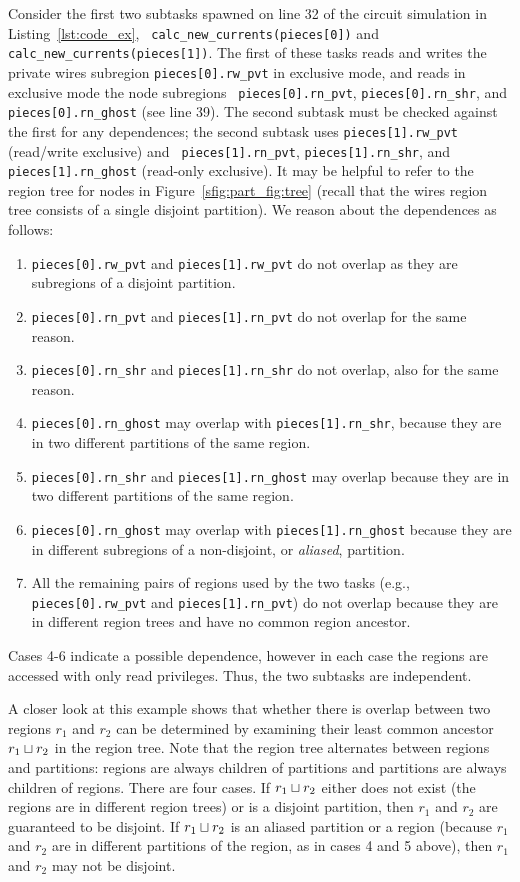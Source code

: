 Consider the first two subtasks spawned on line 32 of the circuit
simulation in Listing~\ref{lst:code_ex}, {\tt
calc\_new\_currents(pieces[0])} and {\tt
calc\_new\_currents(pieces[1])}.  The first of these tasks reads and
writes the private wires subregion {\tt pieces[0].rw\_pvt} in
exclusive mode, and reads in exclusive mode the node subregions {\tt
pieces[0].rn\_pvt}, {\tt pieces[0].rn\_shr}, and {\tt
pieces[0].rn\_ghost} (see line 39).  The second subtask must be
checked against the first for any dependences; the second subtask uses
{\tt pieces[1].rw\_pvt} (read/write exclusive) and {\tt
pieces[1].rn\_pvt}, {\tt pieces[1].rn\_shr}, and {\tt pieces[1].rn\_ghost} (read-only exclusive).
It may be helpful to refer to the region tree for nodes in Figure~\ref{sfig:part_fig:tree} (recall that the wires region tree consists of a single disjoint partition).  We reason about the dependences as follows:
\begin{enumerate}
\item {\tt pieces[0].rw\_pvt} and {\tt pieces[1].rw\_pvt} do not overlap as they are subregions of a disjoint partition.
\item {\tt pieces[0].rn\_pvt} and {\tt pieces[1].rn\_pvt} do not overlap for the same reason.
\item {\tt pieces[0].rn\_shr} and {\tt pieces[1].rn\_shr} do not overlap, also for the same reason.
\item {\tt pieces[0].rn\_ghost} may overlap with {\tt pieces[1].rn\_shr}, because they are in two different
  partitions of the same region.
\item {\tt pieces[0].rn\_shr} and {\tt pieces[1].rn\_ghost} may overlap because they are in two different
  partitions of the same region.
\item {\tt pieces[0].rn\_ghost} may overlap with {\tt pieces[1].rn\_ghost} because they are in different subregions of
a non-disjoint, or {\em aliased}, partition.
\item All the remaining pairs of regions used by the two tasks (e.g., {\tt pieces[0].rw\_pvt} and {\tt pieces[1].rn\_pvt})
do not overlap because they are in different region trees and have no common region ancestor.
\end{enumerate}
Cases 4-6 indicate a possible dependence, however in each case the regions are accessed with only read privileges.  Thus, the two subtasks are independent.

A closer look at this example shows that whether there is overlap
between two regions $r_1$ and $r_2$ can be determined by examining
their least common ancestor $r_1 \sqcup r_2$ in the region tree.  Note
that the region tree alternates between regions and partitions:
regions are always children of partitions and
partitions are always children of regions.  There
are four cases.  If $r_1 \sqcup r_2$ either does not exist (the regions
are in different region trees) or is a disjoint partition, then $r_1$
and $r_2$ are guaranteed to be disjoint.  If $r_1 \sqcup r_2$ is an
aliased partition or a region (because $r_1$ and $r_2$ are in
different partitions of the region, as in cases 4 and 5
above), then $r_1$ and $r_2$ may not be disjoint.

